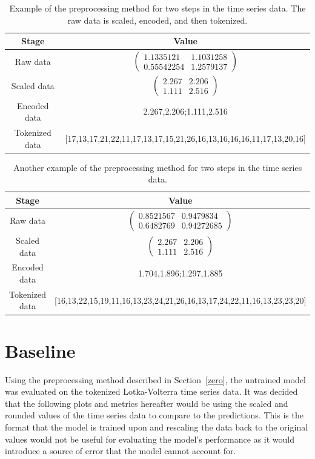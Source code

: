 \documentclass[11pt,a4paper]{article}
\begin{document}
\begin{table}
    \centering
    \begin{tabular}{c|c}
        Stage & Value \\
        \hline
        Raw data & $\begin{pmatrix} 1.1335121  & 1.1031258 \\ 0.55542254  & 1.2579137 \end{pmatrix}$ \\
        Scaled data & $\begin{pmatrix} 2.267 & 2.206 \\ 1.111 & 2.516 \end{pmatrix}$ \\
        Encoded data & 2.267,2.206;1.111,2.516 \\
        Tokenized data & [17,13,17,21,22,11,17,13,17,15,21,26,16,13,16,16,16,11,17,13,20,16]
    \end{tabular}
    \caption{Example of the preprocessing method for two steps in the time series data. The raw data is scaled, encoded, and then tokenized.}
    \label{tab:example}
\end{table}

\begin{table}
    \centering
    \begin{tabular}{c|c}
        Stage & Value \\
        \hline
        Raw data & $\begin{pmatrix} 0.8521567 & 0.9479834   \\ 0.6482769  & 0.94272685  \end{pmatrix}$ \\
        Scaled data & $\begin{pmatrix} 2.267 & 2.206 \\ 1.111 & 2.516 \end{pmatrix}$ \\
        Encoded data & 1.704,1.896;1.297,1.885 \\
        Tokenized data & [16,13,22,15,19,11,16,13,23,24,21,26,16,13,17,24,22,11,16,13,23,23,20]
    \end{tabular}
    \caption{Another example of the preprocessing method for two steps in the time series data.}
    \label{tab:example2}
\end{table}
\clearpage
\section{Baseline}
\label{sec:baseline}
Using the preprocessing method described in Section~\ref{zero}, the untrained model was evaluated on the tokenized Lotka-Volterra time series data. It was decided that the following plots and metrics hereafter would be using the scaled and rounded values of the time series data to compare to the predictions. This is the format that the model is trained upon and rescaling the data back to the original values would not be useful for evaluating the model's performance as it would introduce a source of error that the model cannot account for.
\end{document}
